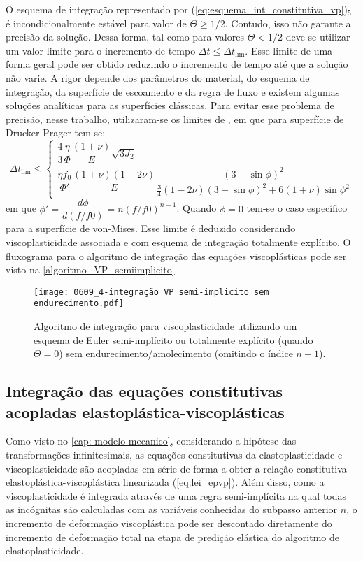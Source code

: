 O esquema de integração representado por (\ref{eq:esquema_int_constitutiva_vp})$_5$ é incondicionalmente estável para valor de $\Theta \geq 1/2$. Contudo, isso não garante a precisão da solução. Dessa forma, tal como para valores $\Theta < 1/2$ deve-se utilizar um valor limite para o incremento de tempo $\Delta t \leq \Delta t_{\text{lim}}$. Esse limite de uma forma geral pode ser obtido reduzindo o incremento de tempo até que a solução não varie. A rigor depende dos parâmetros do material, do esquema de integração, da superfície de escoamento e da regra de fluxo e existem algumas soluções analíticas para as superfícies clássicas. Para evitar esse problema de precisão, nesse trabalho, utilizaram-se os limites de , em que para superfície de Drucker-Prager tem-se:
\begin{equation}
	\label{eq:deltatmin_dp}
	\Delta t_{\text{lim}} \leq \left\{ 
		\begin{array}{lcl} 
			\dfrac{4}{3}\dfrac{\eta}{\Phi}\dfrac{(1+\nu)}{E} {\sqrt{3J_2}} \\
			\dfrac{\eta f_0}{\Phi'}\dfrac{(1+\nu)(1-2\nu)}{E}\dfrac{(3-\sin{\phi})^2}{\frac{3}{4}(1-2\nu)(3-\sin{\phi})^2 + 6(1+\nu)\sin{\phi}^2}
		\end{array} \right.
\end{equation}
em que $\phi'= \dfrac{d \phi}{d(f/f0)} = n(f/f0)^{n-1}$. Quando $\phi = 0$ tem-se o caso específico para a superfície de von-Mises. Esse limite é deduzido considerando viscoplasticidade associada e com esquema de integração totalmente explícito. O fluxograma para o algoritmo de integração das equações viscoplásticas pode ser visto na \autoref{algoritmo_VP_semiimplicito}.
\begin{figure}[H]
	\begin{center}
		\texttt{[image: 0609\_4-integração VP semi-implicito sem endurecimento.pdf]}
	\end{center}
	\caption{\label{algoritmo_VP_semiimplicito}Algoritmo de integração para viscoplasticidade utilizando um esquema de Euler semi-implícito ou totalmente explícito (quando $\Theta = 0$) sem endurecimento/amolecimento (omitindo o índice $n+1$).}
\end{figure}

\subsection{Integração das equações constitutivas acopladas elastoplástica-viscoplásticas}
Como visto no \autoref{cap: modelo mecanico}, considerando a hipótese das transformações infinitesimais, as equações constitutivas da elastoplasticidade e viscoplasticidade são acopladas em série de forma a obter a relação constitutiva elastoplástica-viscoplástica linearizada (\ref{eq:lei_epvp}). Além disso, como a viscoplasticidade é integrada através de uma regra semi-implícita na qual todas as incógnitas são calculadas com as variáveis conhecidas do subpasso anterior $n$, o incremento de deformação viscoplástica pode ser descontado diretamente do incremento de deformação total na etapa de predição elástica do algoritmo de elastoplasticidade.

